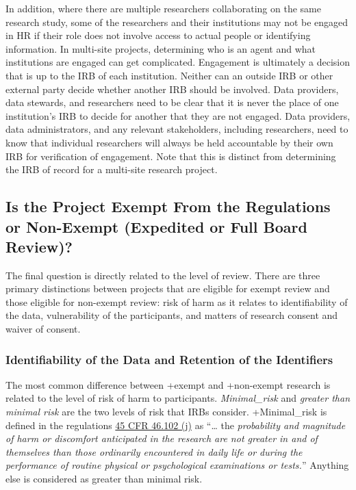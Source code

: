 \documentclass[
]{book}
\begin{document}
In addition, where there are multiple researchers collaborating on the same research study, some of the researchers and their institutions may not be engaged in HR if their role does not involve access to actual people or identifying information. In multi-site projects, determining who is an agent and what institutions are engaged can get complicated. Engagement is ultimately a decision that is up to the IRB of each institution. Neither can an outside IRB or other external party decide whether another IRB should be involved. Data providers, data stewards, and researchers need to be clear that it is never the place of one institution's IRB to decide for another that they are not engaged. Data providers, data administrators, and any relevant stakeholders, including researchers, need to know that individual researchers will always be held accountable by their own IRB for verification of engagement. Note that this is distinct from determining the IRB of record for a multi-site research project.

\hypertarget{is-the-project-exempt-from-the-regulations-or-non-exempt-expedited-or-full-board-review}{%
\subsection{Is the Project Exempt From the Regulations or Non-Exempt (Expedited or Full Board Review)?}\label{is-the-project-exempt-from-the-regulations-or-non-exempt-expedited-or-full-board-review}}

The final question is directly related to the level of review. There are three primary distinctions between projects that are eligible for exempt review and those eligible for non-exempt review: risk of harm as it relates to identifiability of the data, vulnerability of the participants, and matters of research consent and waiver of consent.

\hypertarget{identifiability-of-the-data-and-retention-of-the-identifiers}{%
\subsubsection{Identifiability of the Data and Retention of the Identifiers}\label{identifiability-of-the-data-and-retention-of-the-identifiers}}

The most common difference between +exempt\textbar{} and +non-exempt\textbar{} research is related to the level of risk of harm to participants. \emph{Minimal\_risk} and \emph{greater than minimal risk} are the two levels of risk that IRBs consider. +Minimal\_risk\textbar{} is defined in the regulations \href{https://www.law.cornell.edu/cfr/text/45/46.102}{45 CFR 46.102 (j)} as ``\ldots{} the \emph{probability and magnitude of harm or discomfort anticipated in the research are not greater in and of themselves than those ordinarily encountered in daily life or during the performance of routine physical or psychological examinations or tests.}'' Anything else is considered as greater than minimal risk.
\end{document}
